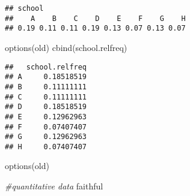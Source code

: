 \documentclass[
]{article}
\newenvironment{Shaded}{\begin{snugshade}}{\end{snugshade}}
\newcommand{\CommentTok}[1]{\textcolor[rgb]{0.56,0.35,0.01}{\textit{#1}}}
\newcommand{\FunctionTok}[1]{\textcolor[rgb]{0.00,0.00,0.00}{#1}}
\newcommand{\NormalTok}[1]{#1}
\begin{document}
\begin{verbatim}
## school
##    A    B    C    D    E    F    G    H 
## 0.19 0.11 0.11 0.19 0.13 0.07 0.13 0.07
\end{verbatim}

\begin{Shaded}
\begin{Highlighting}[]
\FunctionTok{options}\NormalTok{(old)}
\FunctionTok{cbind}\NormalTok{(school.relfreq)}
\end{Highlighting}
\end{Shaded}

\begin{verbatim}
##   school.relfreq
## A     0.18518519
## B     0.11111111
## C     0.11111111
## D     0.18518519
## E     0.12962963
## F     0.07407407
## G     0.12962963
## H     0.07407407
\end{verbatim}

\begin{Shaded}
\begin{Highlighting}[]
\FunctionTok{options}\NormalTok{(old)}
\end{Highlighting}
\end{Shaded}

\begin{Shaded}
\begin{Highlighting}[]
\CommentTok{\#quantitative data}
\NormalTok{faithful}
\end{Highlighting}
\end{Shaded}
\end{document}
